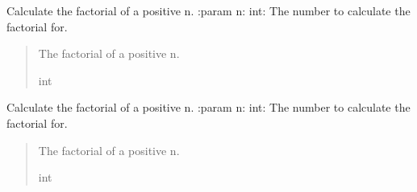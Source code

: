 \documentclass[letterpaper,10pt,english]{sphinxmanual}
\begin{document}

\begin{fulllineitems}
\label{\detokenize{chapter5:chapter5.recusions_demo.factorial_me}}
\pysigstartsignatures
{}
\pysigstopsignatures
\sphinxAtStartPar
Calculate the factorial of a positive n.
:param n: int: The number to calculate the factorial for.
\begin{quote}\begin{description}
\sphinxAtStartPar
The factorial of a positive n.

\sphinxAtStartPar
int

\end{description}\end{quote}

\end{fulllineitems}


\begin{fulllineitems}
\label{\detokenize{chapter5:chapter5.recusions_demo.new_fac}}
\pysigstartsignatures
{}
\pysigstopsignatures
\sphinxAtStartPar
Calculate the factorial of a positive n.
:param n: int: The number to calculate the factorial for.
\begin{quote}\begin{description}
\sphinxAtStartPar
The factorial of a positive n.

\sphinxAtStartPar
int

\end{description}\end{quote}

\end{fulllineitems}

\end{document}
